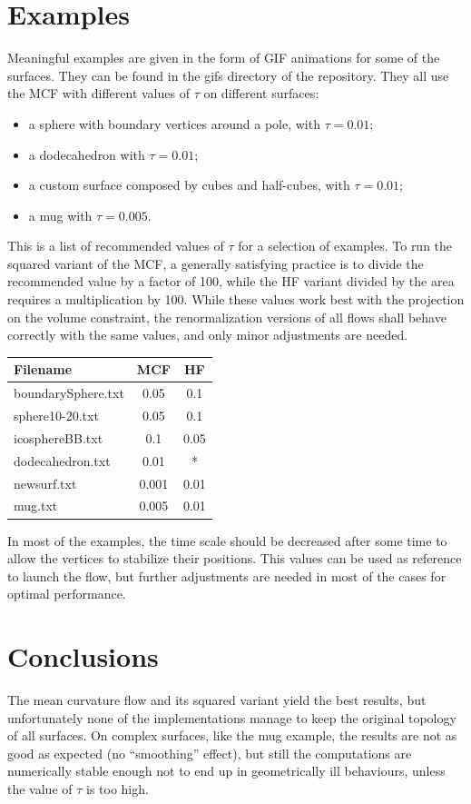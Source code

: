 \documentclass{article}
\begin{document}
\section*{Examples}
Meaningful examples are given in the form of GIF animations for some of the surfaces.
They can be found in the gifs directory of the repository. They all use the
MCF with different values of $\tau$ on different surfaces:
\begin{itemize}
  \item a sphere with boundary vertices around a pole, with $\tau = 0.01$;
  \item a dodecahedron with $\tau = 0.01$;
  \item a custom surface composed by cubes and half-cubes, with $\tau = 0.01$;
  \item a mug with $\tau = 0.005$.
\end{itemize}
This is a list of recommended values of $\tau$ for a selection of examples.
To run the squared variant of the MCF, a generally satisfying practice is
to divide the recommended value by a factor of 100, while the HF variant divided by the
area requires a multiplication by 100. While these values work best with
the projection on the volume constraint, the renormalization versions of all flows
shall behave correctly with the same values, and only minor adjustments are needed.
\begin{center}
  \begin{tabular}{lcc}
    Filename        & MCF & HF \\
    \hline
    boundarySphere.txt  & 0.05 & 0.1 \\
    sphere10-20.txt     & 0.05 & 0.1 \\
    icosphereBB.txt     & 0.1 & 0.05 \\
    dodecahedron.txt    & 0.01 & * \\
    newsurf.txt         & 0.001 & 0.01 \\
    mug.txt             & 0.005 & 0.01 \\
  \end{tabular}
\end{center}
In most of the examples, the time scale should be decreased after some time
to allow the vertices to stabilize their positions. This values can be used
as reference to launch the flow, but further adjustments are needed in most of
the cases for optimal performance.

\section*{Conclusions}
The mean curvature flow and its squared variant yield the best results, but
unfortunately none of the implementations manage to keep the original topology of
all surfaces. On complex surfaces, like the mug example, the results are
not as good as expected (no ``smoothing'' effect), but still the computations
are numerically stable enough not to end up in geometrically ill behaviours,
unless the value of $\tau$ is too high.
\end{document}
